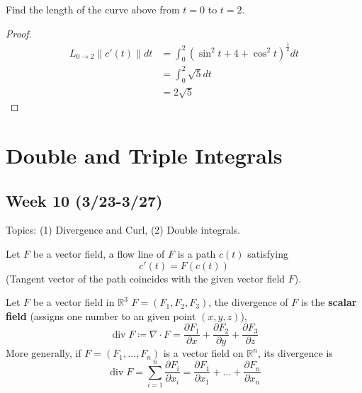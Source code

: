 \documentclass[openany]{book}
\newcommand{\R}{\mathbb{R}}
\newcommand{\diverg}{\operatorname{div}}
\begin{document}
\begin{prob}
    Find the length of the curve above from $t=0$ to $t=2$.
\end{prob}
\begin{proof}
    \begin{align*}
        L_{0\to 2}\|c'(t)\|dt&=\int_0^2\left(\sin^2t+4+\cos^2t\right)^\frac{1}{2}dt\\
        &=\int_0^2\sqrt{5}dt\\
        &=2\sqrt{5}
    \end{align*}
\end{proof}




\chapter{Double and Triple Integrals}

\section*{\centering Week 10 (3/23-3/27)}



\noindent
Topics: (1) Divergence and Curl, (2) Double integrals.



\begin{defn}
    Let ${F}$ be a vector field, a flow line of $F$ is a path $c(t)$ satisfying 
    \begin{equation*}
        c'(t)=F(c(t))
    \end{equation*}
    (Tangent vector of the path coincides with the given vector field ${F}$).
\end{defn}

\begin{defn}[divergence]
    Let ${F}$ be a vector field in $\R^3$ $F=(F_1,F_2,F_3)$, the divergence of ${F}$ is the \textbf{scalar field} (assigns one number to an given point $(x, y, z)$), 
    \begin{equation*}
        \diverg F\coloneq\nabla\cdot F=\frac{\partial F_1}{\partial x}+\frac{\partial F_2}{\partial y}+\frac{\partial F_3}{\partial z}
    \end{equation*}
    More generally, if $F=(F_1,\dots, F_n)$ is a vector field on $\R^n$, its divergence is 
    \begin{equation*}
        \diverg F=\sum_{i=1}^n\frac{\partial F_i}{\partial x_i}=\frac{\partial F_1}{\partial x_1}+\dots+\frac{\partial F_n}{\partial x_n}
    \end{equation*}
\end{defn}
\end{document}
